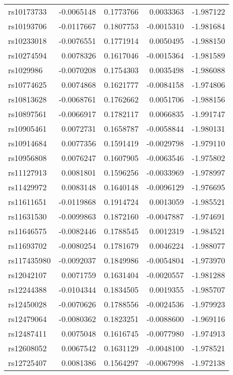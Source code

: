 \documentclass[AMA,STIX1COL,]{WileyNJD-v2}
\begin{document}
\begin{longtable}[t]{lrrrr}
\endfoot
\bottomrule
\endlastfoot
rs10173733 & -0.0065148 & 0.1773766 & 0.0033363 & -1.987122\\
rs10193706 & -0.0117667 & 0.1807753 & -0.0015310 & -1.981684\\
rs10233018 & -0.0076551 & 0.1771914 & 0.0050495 & -1.988150\\
rs10274594 & 0.0078326 & 0.1617046 & -0.0015364 & -1.981589\\
rs1029986 & -0.0070208 & 0.1754303 & 0.0035498 & -1.986088\\
\addlinespace
rs10774625 & 0.0074868 & 0.1621777 & -0.0084158 & -1.974806\\
rs10813628 & -0.0068761 & 0.1762662 & 0.0051706 & -1.988156\\
rs10897561 & -0.0066917 & 0.1782117 & 0.0066835 & -1.991747\\
rs10905461 & 0.0072731 & 0.1658787 & -0.0058844 & -1.980131\\
rs10914684 & 0.0077356 & 0.1591419 & -0.0029798 & -1.979110\\
\addlinespace
rs10956808 & 0.0076247 & 0.1607905 & -0.0063546 & -1.975802\\
rs11127913 & 0.0081801 & 0.1596256 & -0.0033969 & -1.978997\\
rs11429972 & 0.0083148 & 0.1640148 & -0.0096129 & -1.976695\\
rs11611651 & -0.0119868 & 0.1914724 & 0.0013059 & -1.985521\\
rs11631530 & -0.0099863 & 0.1872160 & -0.0047887 & -1.974691\\
\addlinespace
rs11646575 & -0.0082446 & 0.1788545 & 0.0012319 & -1.984521\\
rs11693702 & -0.0080254 & 0.1781679 & 0.0046224 & -1.988077\\
rs117435980 & -0.0092037 & 0.1849986 & -0.0054804 & -1.973970\\
rs12042107 & 0.0071759 & 0.1631404 & -0.0020557 & -1.981288\\
rs12244388 & -0.0104344 & 0.1834505 & 0.0019355 & -1.985707\\
\addlinespace
rs12450028 & -0.0070626 & 0.1788556 & -0.0024536 & -1.979923\\
rs12479064 & -0.0080362 & 0.1823251 & -0.0088600 & -1.969116\\
rs12487411 & 0.0075048 & 0.1616745 & -0.0077980 & -1.974913\\
rs12608052 & 0.0067542 & 0.1631129 & -0.0048100 & -1.978521\\
rs12725407 & 0.0081386 & 0.1564297 & -0.0067998 & -1.972138\\

\end{longtable}
\end{document}
